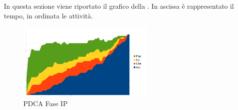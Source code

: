 	In questa sezione viene riportato il grafico  della . In ascissa è rappresentato il tempo, in ordinata le attività.
	\begin{figure}[H]
		\centering
		\includegraphics[width=0.6\textwidth]{PianoDiQualifica/Pics/GraficoPDCAFaseSD.pdf}
		\caption{PDCA Fase IP}
	\end{figure}